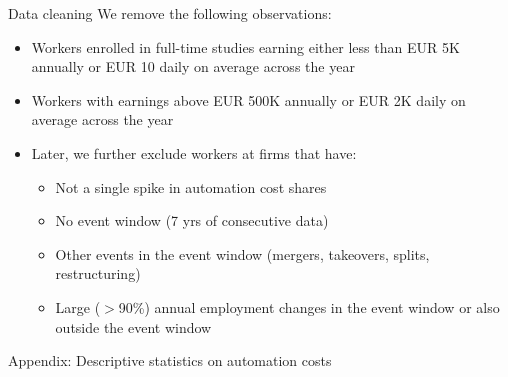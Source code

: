 \documentclass[aspectratio=169]{beamer}
\begin{document}
\begin{frame}{Data cleaning \hyperlink{data}{}} \label{data_cleaning}
We remove the following observations:
\medskip
\begin{itemize}
\item Workers enrolled in full-time studies earning either less than EUR 5K  annually or EUR 10 daily on average across the year
\medskip
\item Workers with earnings above EUR 500K annually or EUR 2K daily on average across the year
\medskip
\item Later, we further exclude workers at firms that have:
\begin{itemize}
\item Not a single spike in automation cost shares \smallskip
\item No event window (7 yrs of consecutive data) \smallskip
\item Other events in the event window (mergers, takeovers, splits, restructuring) \smallskip
\item Large ($>$90\%) annual employment changes in the event window or also outside the event window
\smallskip
\end{itemize}
\end{itemize}
\end{frame}

\begin{frame}
\begin{center}
{\Large Appendix: Descriptive statistics on automation costs}
\end{center}
\end{frame}
\end{document}
